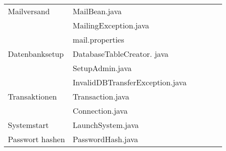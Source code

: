 \begin{landscape}
\begin{tabular}{|p{6cm} |p{6cm}|p{3cm}|p{3cm}|p{2cm}|p{3cm}|}
	\hline  Mailversand          & MailBean.java                              &                            &                             &                     &\\ 	
	& MailingException.java                      &                            &                             &                     &\\
	& mail.properties                            &                            &                             &                     &\\
	\hline Datenbanksetup        & DatabaseTableCreator. java                 &                            &                             &                     &\\
	& SetupAdmin.java                            &                            &                             &                     &\\
	& InvalidDBTransferException.java            &                            &                             &                     &\\
	\hline Transaktionen         & Transaction.java                           &                            &                             &                     &\\  
	& Connection.java                            &                            &                             &                     &\\  
	\hline Systemstart           & LaunchSystem.java                          &                            &                             &                     &\\
	\hline Passwort hashen       & PasswordHash.java                          &                            &                             &                     &\\       	   
	\hline 
\end{tabular} \ \\
\ \\


\end{landscape}
